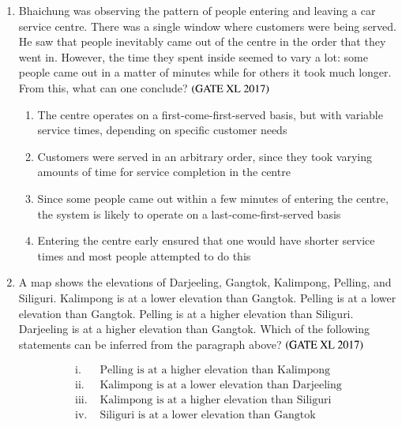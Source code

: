 \documentclass[journal]{IEEEtran}
\begin{document}
\begin{enumerate}
\item Bhaichung was observing the pattern of people entering and leaving a car service centre. There was a single window where customers were being served. He saw that people inevitably came out of the centre in the order that they went in. However, the time they spent inside seemed to vary a lot: some people came out in a matter of minutes while for others it took much longer. From this, what can one conclude? \hfill $\left(\text{GATE XL 2017}\right)$
\begin{enumerate}
    \item The centre operates on a first-come-first-served basis, but with variable service times, depending on specific customer needs
    \item Customers were served in an arbitrary order, since they took varying amounts of time for service completion in the centre
    \item Since some people came out within a few minutes of entering the centre, the system is likely to operate on a last-come-first-served basis
    \item Entering the centre early ensured that one would have shorter service times and most people attempted to do this
\end{enumerate}

\item A map shows the elevations of Darjeeling, Gangtok, Kalimpong, Pelling, and Siliguri. Kalimpong is at a lower elevation than Gangtok. Pelling is at a lower elevation than Gangtok. Pelling is at a higher elevation than Siliguri. Darjeeling is at a higher elevation than Gangtok. Which of the following statements can be inferred from the paragraph above? \hfill $\left(\text{GATE XL 2017}\right)$

\begin{align*}
\text{i. } & \text{Pelling is at a higher elevation than Kalimpong}\\
\text{ii. } & \text{Kalimpong is at a lower elevation than Darjeeling}\\
\text{iii. } & \text{Kalimpong is at a higher elevation than Siliguri}\\
\text{iv. } & \text{Siliguri is at a lower elevation than Gangtok}
\end{align*}

\begin{enumerate}
\end{enumerate}


\end{enumerate}
\end{document}
